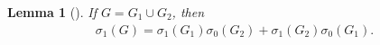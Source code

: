 \documentclass[a4paper,12pt]{amsart}
\newtheorem{lem}{Lemma}
\begin{document}
 \begin{lem}[\cite{andriantiana2024number}]
     \label{lem:sigma_1-and-Z_1}
     If $G = G_1 \cup G_2$, then 
     \begin{align*}
         \sigma_1(G) = \sigma_1(G_1)\sigma_0(G_2) + \sigma_1(G_2)\sigma_0(G_1).
     \end{align*}
 \end{lem}






\end{document}
